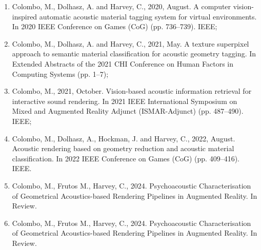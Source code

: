 \begin{enumerate}
    \item Colombo, M., Dolhasz, A. and Harvey, C., 2020, August. A computer vision-inspired automatic acoustic material tagging system for virtual environments. In 2020 IEEE Conference on Games (CoG) (pp. 736--739). IEEE;
    \item Colombo, M., Dolhasz, A. and Harvey, C., 2021, May. A texture superpixel approach to semantic material classification for acoustic geometry tagging. In Extended Abstracts of the 2021 CHI Conference on Human Factors in Computing Systems (pp. 1--7);
    \item Colombo, M., 2021, October. Vision-based acoustic information retrieval for interactive sound rendering. In 2021 IEEE International Symposium on Mixed and Augmented Reality Adjunct (ISMAR-Adjunct) (pp. 487--490). IEEE;
    \item Colombo, M., Dolhasz, A., Hockman, J. and Harvey, C., 2022, August. Acoustic rendering based on geometry reduction and acoustic material classification. In 2022 IEEE Conference on Games (CoG) (pp. 409--416). IEEE.
    \item Colombo, M., Frutos M., Harvey, C., 2024. Psychoacoustic Characterisation of Geometrical Acoustics-based Rendering Pipelines in Augmented Reality. In Review.
    \item Colombo, M., Frutos M., Harvey, C., 2024. Psychoacoustic Characterisation of Geometrical Acoustics-based Rendering Pipelines in Augmented Reality. In Review.
\end{enumerate}

